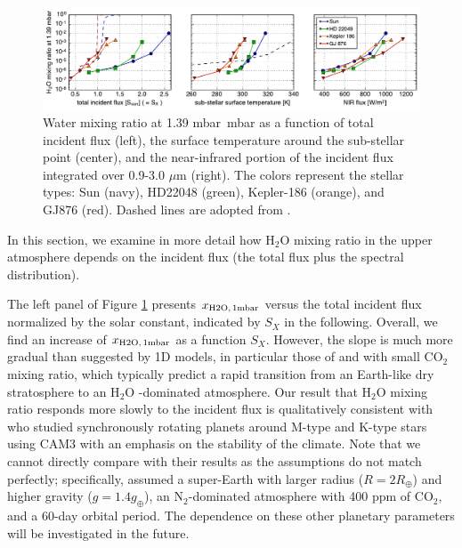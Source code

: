 \documentclass[11pt,numberedappendix,twocolappendix,]{emulateapj}
\def\water{H$_2$O }
\def\xwater{$x_{\rm H2O,\,1mbar}$ }
\def\preslevel{1.39 mbar\ }
\begin{document}
\begin{figure}[!tb]
    \begin{center}
    \includegraphics[width=\hsize]{fig/xH2O_3panels.pdf}
    \end{center}
\caption{Water mixing ratio at \preslevel mbar as a function of total incident flux (left), the surface temperature around the sub-stellar point (center), and the near-infrared portion of the incident flux integrated over 0.9-3.0 $\mu $m (right). The colors represent the stellar types: Sun (navy), HD22048 (green), Kepler-186 (orange), and GJ876 (red). Dashed lines are adopted from \citet{Kasting1993}. }                                                                                                             
\label{fig:xH2O_S0X}
\end{figure}

In this section, we examine in more detail how \water mixing ratio in the upper atmosphere depends on the incident flux (the total flux plus the spectral distribution). 

The left panel of Figure \ref{fig:xH2O_S0X} presents \xwater versus the total incident flux normalized by the solar constant, indicated by $S_X$ in the following. 
Overall, we find an increase of \xwater as a function $S_X$. 
However, the slope is much more gradual than suggested by 1D models, in particular those  of \citet{Kasting1993} and \citet{Wordsworth2013} with small CO$_2$ mixing ratio, which typically predict a rapid transition from an Earth-like dry stratosphere to an \water-dominated atmosphere. 
Our result that \water mixing ratio responds more slowly to the incident flux is qualitatively consistent with \citet{Yang2013} who studied synchronously rotating planets around M-type and K-type stars using CAM3 with an emphasis on the stability of the climate. 
Note that we cannot directly compare with their results as the assumptions do not match perfectly; specifically, \cite{Yang2013} assumed a super-Earth with larger radius ($R=2R_{\oplus}$) and higher gravity ($g=1.4g_{\oplus}$), an N$_2$-dominated atmosphere with 400 ppm of CO$_2$, and a 60-day orbital period. 
The dependence on these other planetary parameters will be investigated in the future. 
\end{document}
